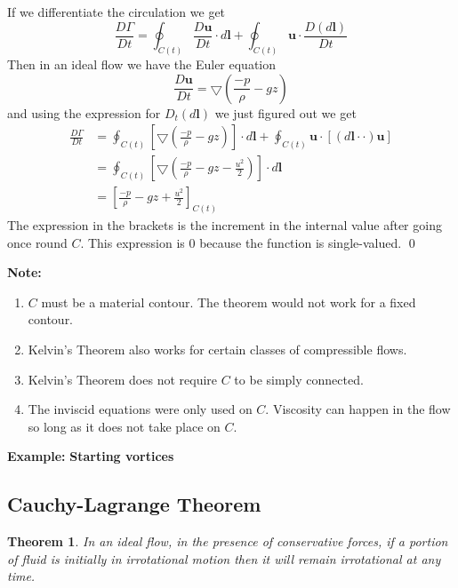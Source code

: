 \documentclass[11pt]{article}
\newcommand*{\md}[1]{\ensuremath{\frac{D #1}{D t}}}
\newcommand{\grad}{\bigtriangledown}
\newcommand{\mv}[1]{\bm{#1}}
\renewenvironment{proof}{{\bfseries Proof}}{\qed}
\newtheorem{theorem}{Theorem}[section]
\newenvironment{eg}
{\begin{mdframed}[backgroundcolor=mylg, roundcorner=5pt, linewidth=0pt]\textbf{Example: }\normalfont}
    {\end{mdframed}}
\newenvironment{note}
    {\textbf{Note:}\begin{mdframed}[backgroundcolor=white, roundcorner=5pt, linewidth=0pt]}
    {\end{mdframed}}
\begin{document}
\begin{proof}
If we differentiate the circulation we get
\[
	\md{\Gamma}=\oint_{C(t)}\md{\mv{u}} \cdot d\mv{l} + \oint_{C(t)} \mv{u} \cdot \md{(d\mv{l})}
\]
Then in an ideal flow we have the Euler equation
\[
	\md{\mv{u}}=\grad\left( \frac{-p}{\rho}-gz\right)
\]
and using the expression for $D_t(d\mv{l})$ we just figured out we get
\begin{align*}
	\md{\Gamma} & = \oint_{C(t)}\left[ \grad\left( \frac{-p}{\rho}-gz\right)\right]\cdot d\mv{l} + \oint_{C(t)} \mv{u} \cdot \left[ (d\mv{l}\cdot\cdot)\mv{u}\right] \\
				& = \oint_{C(t)} \left[ \grad \left( \frac{-p}{\rho}-gz - \frac{u^2}{2}\right)\right]\cdot d\mv{l} \\
				& = \left[ \frac{-p}{\rho}-gz+\frac{u^2}{2}\right]_{C(t)}
\end{align*}
The expression in the brackets is the increment in the internal value after going once round $C$.
This expression is $0$ because the function is single-valued.
\end{proof}

\begin{note}
	\begin{enumerate}
		\item $C$ must be a material contour. The theorem would not work for a fixed contour.
		\item Kelvin's Theorem also works for certain classes of compressible flows.
		\item Kelvin's Theorem does not require $C$ to be simply connected.
		\item The inviscid equations were only used on $C$.
			Viscosity can happen in the flow so long as it does not take place on $C$.
	\end{enumerate}
\end{note}

\begin{eg}
	\textbf{Starting vortices}
\end{eg}

\subsection{Cauchy-Lagrange Theorem}
\begin{theorem}
In an ideal flow, in the presence of conservative forces, if a portion of fluid is initially in irrotational motion then it will remain irrotational at any time.
\end{theorem}
\end{document}
